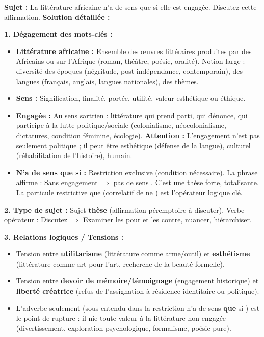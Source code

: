 \documentclass[11pt]{article}
\begin{document}
\begin{exoresolu}
\textbf{Sujet :} \og La littérature africaine n'a de sens que si elle est engagée. \fg{} Discutez cette affirmation.
\tcblower
\textbf{Solution détaillée :}

\textbf{1. Dégagement des mots-clés :}
\begin{itemize}
    \item \textbf{Littérature africaine :} Ensemble des œuvres littéraires produites par des Africains ou sur l'Afrique (roman, théâtre, poésie, oralité). Notion large : diversité des époques (négritude, post-indépendance, contemporain), des langues (français, anglais, langues nationales), des thèmes.
    \item \textbf{Sens :} Signification, finalité, portée, utilité, valeur esthétique ou éthique.
    \item \textbf{Engagée :} Au sens sartrien : littérature qui prend parti, qui dénonce, qui participe à la lutte politique/sociale (colonialisme, néocolonialisme, dictatures, condition féminine, écologie). \textbf{Attention :} L'engagement n'est pas seulement politique ; il peut être esthétique (défense de la langue), culturel (réhabilitation de l'histoire), humain.
    \item \textbf{N'a de sens que si :} Restriction exclusive (condition nécessaire). La phrase affirme : \og Sans engagement $\Rightarrow$ pas de sens \fg. C'est une thèse forte, totalisante. La particule restrictive \og que \fg (correlatif de \og ne \fg) est l'opérateur logique clé.
\end{itemize}

\textbf{2. Type de sujet :} Sujet \textbf{thèse} (affirmation péremptoire à discuter). Verbe opérateur : \og Discutez \fg $\Rightarrow$ Examiner les pour et les contre, nuancer, hiérarchiser.

\textbf{3. Relations logiques / Tensions :}
\begin{itemize}
    \item Tension entre \textbf{utilitarisme} (littérature comme arme/outil) et \textbf{esthétisme} (littérature comme art pour l'art, recherche de la beauté formelle).
    \item Tension entre \textbf{devoir de mémoire/témoignage} (engagement historique) et \textbf{liberté créatrice} (refus de l'assignation à résidence identitaire ou politique).
    \item L'adverbe \og seulement \fg (sous-entendu dans la restriction \og n'a de sens \textbf{que} si \fg) est le point de rupture : il nie toute valeur à la littérature non engagée (divertissement, exploration psychologique, formalisme, poésie pure).
\end{itemize}


\end{exoresolu}
\end{document}
